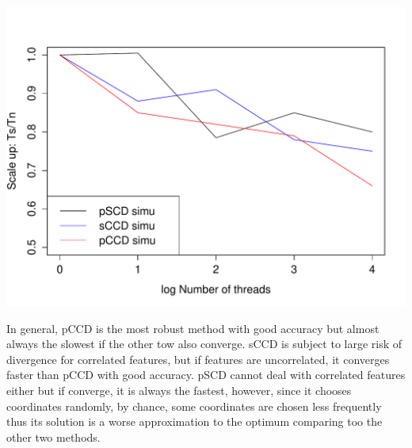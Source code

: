 \documentclass[11 pt, a4paper]{article}  %
\begin{document}
\begin{center}
\includegraphics[scale=0.5]{scaleup.pdf}
\end{center}

In general, pCCD is the most robust method with good accuracy but almost always the slowest if the other tow also converge. sCCD is subject to large risk of divergence for correlated features, but if features are uncorrelated, it converges faster than pCCD with good accuracy. pSCD cannot deal with correlated features either but if converge, it is always the fastest, however, since it chooses coordinates randomly, by chance, some coordinates are chosen less frequently thus its solution is a worse approximation to the optimum comparing too the other two methods.





\end{document}
